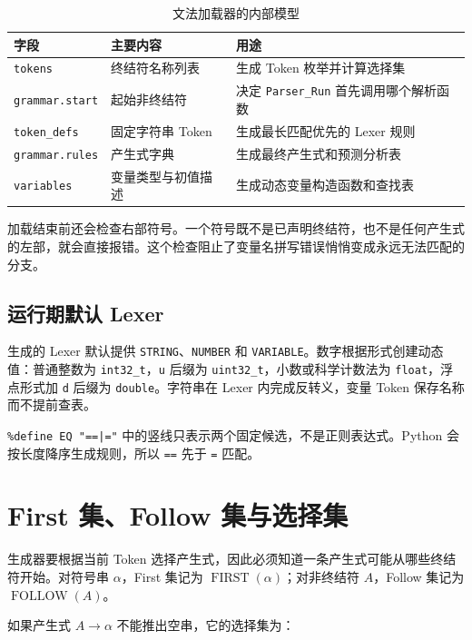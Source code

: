 \begin{table}[htbp]
\centering
\caption{文法加载器的内部模型} \label{tab:app-grammar-model}
\begin{tabularx}{\textwidth}{llX}
\toprule
字段 & 主要内容 & 用途 \\
\midrule
\texttt{tokens} & 终结符名称列表 & 生成 Token 枚举并计算选择集 \\
\texttt{grammar.start} & 起始非终结符 & 决定 \texttt{Parser\_Run} 首先调用哪个解析函数 \\
\texttt{token\_defs} & 固定字符串 Token & 生成最长匹配优先的 Lexer 规则 \\
\texttt{grammar.rules} & 产生式字典 & 生成最终产生式和预测分析表 \\
\texttt{variables} & 变量类型与初值描述 & 生成动态变量构造函数和查找表 \\
\bottomrule
\end{tabularx}
\end{table}

加载结束前还会检查右部符号。一个符号既不是已声明终结符，也不是任何产生式的左部，就会直接报错。这个检查阻止了变量名拼写错误悄悄变成永远无法匹配的分支。

\subsection{运行期默认 Lexer}

生成的 Lexer 默认提供 \texttt{STRING}、\texttt{NUMBER} 和 \texttt{VARIABLE}。数字根据形式创建动态值：普通整数为 \texttt{int32\_t}，\texttt{u} 后缀为 \texttt{uint32\_t}，小数或科学计数法为 \texttt{float}，浮点形式加 \texttt{d} 后缀为 \texttt{double}。字符串在 Lexer 内完成反转义，变量 Token 保存名称而不提前查表。

\texttt{\%define EQ "==|="} 中的竖线只表示两个固定候选，不是正则表达式。Python 会按长度降序生成规则，所以 \texttt{==} 先于 \texttt{=} 匹配。

\section{First 集、Follow 集与选择集}

生成器要根据当前 Token 选择产生式，因此必须知道一条产生式可能从哪些终结符开始。对符号串 $\alpha$，First 集记为 $\operatorname{FIRST}(\alpha)$；对非终结符 $A$，Follow 集记为 $\operatorname{FOLLOW}(A)$。

如果产生式 $A\rightarrow\alpha$ 不能推出空串，它的选择集为：

